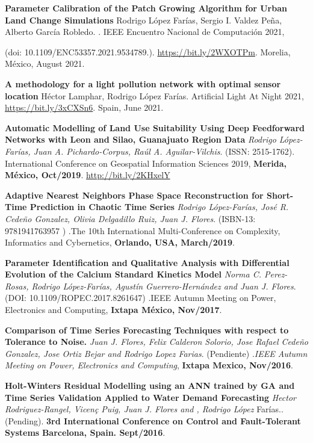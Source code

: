 \documentclass[10pt]{article}
\newenvironment{innerlist}[1][\enskip\textbullet]%
        {\begin{compactitem}[#1]}{\end{compactitem}}
\begin{document}
\begin{innerlist}

\item \textbf{Parameter Calibration of the Patch Growing Algorithm for Urban Land Change Simulations} Rodrigo López Farías, Sergio I. Valdez Peña, Alberto García Robledo. . IEEE Encuentro Nacional de Computación 2021, 

(doi: 10.1109/ENC53357.2021.9534789.).  \url{https://bit.ly/2WXOTPm}. Morelia, México, August 2021.

\item \textbf{A methodology for a light pollution network with
optimal sensor location} Héctor Lamphar, Rodrigo López Farías. Artificial Light At Night 2021, \url{https://bit.ly/3xCXSn6}. Spain, June 2021.

\item \textbf{Automatic Modelling of Land Use Suitability Using Deep Feedforward Networks with Leon and
Silao, Guanajuato Region Data} \textit{Rodrigo López-Farías, Juan A. Pichardo-Corpus, Raúl A. Aguilar-Vilchis}. (ISSN: 2515-1762). {International Conference on Geospatial Information Sciences 2019}, \textbf{Merida, México, Oct/2019}. \url{http://bit.ly/2KHxelY}

\item \textbf{Adaptive Nearest Neighbors Phase Space Reconstruction for Short-Time Prediction in Chaotic Time Series} \textit{Rodrigo López-Farías, José R. Cedeño Gonzalez, Olivia Delgadillo Ruiz, Juan J. Flores}. (ISBN-13: 9781941763957 ) .{The 10th International Multi-Conference on Complexity, Informatics and Cybernetics}, \textbf{Orlando, USA, March/2019}.


\item \textbf{Parameter Identification and Qualitative Analysis with Differential Evolution of the Calcium Standard Kinetics Model} \textit{Norma C. Perez-Rosas, Rodrigo López-Farías, Agustín Guerrero-Hernández and Juan J. Flores}. (DOI: 10.1109/ROPEC.2017.8261647) .{IEEE Autumn Meeting on Power, Electronics and Computing}, \textbf{Ixtapa México, Nov/2017}.


\item \textbf{Comparison of Time Series Forecasting Techniques with respect to Tolerance to Noise.} \textit{Juan J. Flores, Felix Calderon Solorio, Jose Rafael Cede\~no Gonzalez, Jose Ortiz Bejar and Rodrigo Lopez Farias}. (Pendiente) .\textit{IEEE Autumn Meeting on Power, Electronics and Computing}, \textbf{Ixtapa Mexico, Nov/2016}.


\item \textbf{Holt-Winters Residual Modelling using an ANN trained by GA and Time Series Validation Applied to Water Demand Forecasting} \textit{Hector Rodriguez-Rangel, Vicen\c{c} Puig, Juan J. Flores and ,  Rodrigo López} Farías.. (Pending). \textbf{3rd International Conference on Control and Fault-Tolerant Systems} \textbf{Barcelona, Spain. Sept/2016}.


\end{innerlist}
\end{document}
